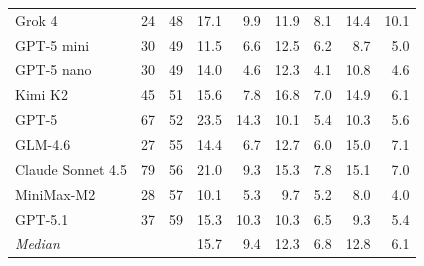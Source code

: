 \begin{tabular}{@{}l r r rr rr rr@{}}
Grok 4                         & 24 & 48 & 17.1 & 9.9 & 11.9 & 8.1 & 14.4 & 10.1 \\
GPT-5 mini                     & 30 & 49 & 11.5 & 6.6 & 12.5 & 6.2 & 8.7 & 5.0 \\
GPT-5 nano                     & 30 & 49 & 14.0 & 4.6 & 12.3 & 4.1 & 10.8 & 4.6 \\
Kimi K2                        & 45 & 51 & 15.6 & 7.8 & 16.8 & 7.0 & 14.9 & 6.1 \\
GPT-5                          & 67 & 52 & 23.5 & 14.3 & 10.1 & 5.4 & 10.3 & 5.6 \\
GLM-4.6                        & 27 & 55 & 14.4 & 6.7 & 12.7 & 6.0 & 15.0 & 7.1 \\
Claude Sonnet 4.5              & 79 & 56 & 21.0 & 9.3 & 15.3 & 7.8 & 15.1 & 7.0 \\
MiniMax-M2                     & 28 & 57 & 10.1 & 5.3 & 9.7 & 5.2 & 8.0 & 4.0 \\
GPT-5.1                        & 37 & 59 & 15.3 & 10.3 & 10.3 & 6.5 & 9.3 & 5.4 \\
\midrule
\textit{Median}          &    &    & 15.7 & 9.4 & 12.3 & 6.8 & 12.8 & 6.1 \\
\bottomrule
\end{tabular}

